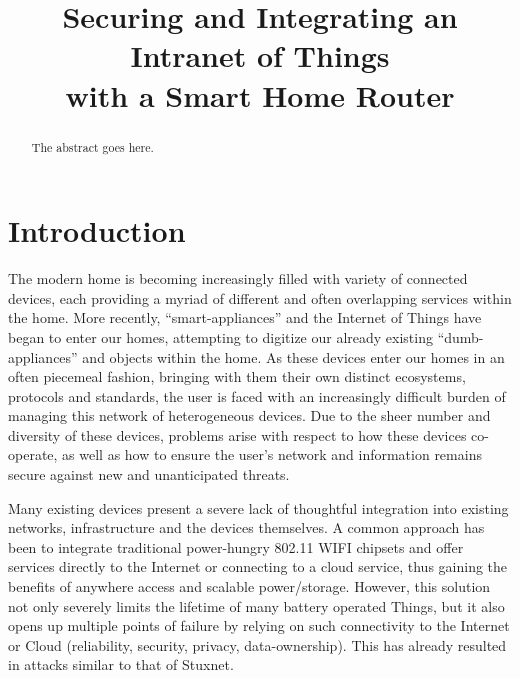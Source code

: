 \documentclass[conference]{./sty/IEEEtran}
\begin{document}
%
\title{Securing and Integrating an Intranet of Things\\ with a Smart Home Router}


\author{
}

\maketitle


\begin{abstract}
The abstract goes here.
\end{abstract}


\section{Introduction}
The modern home is becoming increasingly filled with variety of connected devices, each providing a myriad of different and often overlapping services within the home. More recently, ``smart-appliances'' and the Internet of Things have began to enter our homes, attempting to digitize our already existing ``dumb-appliances'' and objects within the home. As these devices enter our homes in an often piecemeal fashion, bringing with them their own distinct ecosystems, protocols and standards, the user is faced with an increasingly difficult burden of managing this network of heterogeneous devices. Due to the sheer number and diversity of these devices, problems arise with respect to how these devices co-operate, as well as how to ensure the user's network and information remains secure against new and unanticipated threats.

Many existing devices present a severe lack of thoughtful integration into existing networks, infrastructure and the devices themselves. A common approach has been to integrate traditional power-hungry 802.11 WIFI chipsets and offer services directly to the Internet\cite{IETF_CORE,Xively} or connecting to a cloud service\cite{SmartThings,Twine}, thus gaining the benefits of anywhere access and scalable power/storage. However, this solution not only severely limits the lifetime of many battery operated Things, but it also opens up multiple points of failure by relying on such connectivity to the Internet or Cloud (reliability, security, privacy, data-ownership). This has already resulted in attacks similar to that of Stuxnet\cite{IoTWorm}. 
\end{document}
